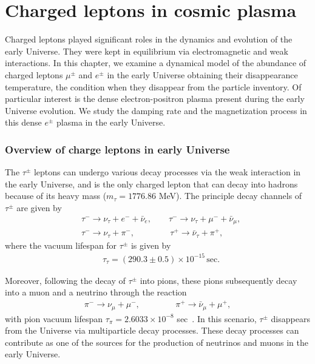 \section{Charged leptons in cosmic plasma}\label{Electron}

Charged leptons played significant roles in the dynamics and evolution of the early Universe. They were kept in equilibrium via electromagnetic and weak interactions.  In this chapter, we examine a dynamical model of the abundance of charged leptons $\mu^\pm$ and $e^\pm$ in the early Universe obtaining their disappearance temperature, the condition when they disappear from the particle inventory. Of particular interest is the dense electron-positron plasma present during the early Universe evolution. We study the damping rate and the magnetization process in this dense $e^\pm$ plasma in the early Universe.

\subsubsection{Overview of charge leptons in early Universe}

The $\tau^\pm$ leptons can undergo various decay processes via the weak interaction in the early Universe, and is the only charged lepton that can decay into hadrons because of its heavy mass ($m_\tau=1776.86$ MeV). The principle decay channels of $\tau^\pm$ are given by
\begin{align}
&\tau^-\rightarrow\nu_\tau+e^-+\bar{\nu}_e,\qquad \tau^-\rightarrow\nu_\tau+\mu^-+\bar{\nu}_\mu,\\
&\tau^-\rightarrow\nu_\tau+\pi^-,\qquad\qquad\,\tau^+\rightarrow\bar{\nu}_\tau+\pi^+,
\end{align}
 where the vacuum lifespan for $\tau^\pm$ is given by ~\cite{ParticleDataGroup:2022pth}
\begin{align}
&\tau_{\tau}=(290.3\pm0.5)\times10^{-15}\,\mathrm{sec}.
\end{align}

Moreover, following the decay of $\tau^\pm$ into pions, these pions subsequently decay into a muon and a neutrino through the reaction
\begin{align}
\pi^-\rightarrow\nu_\mu+\mu^-,\qquad\qquad\,\pi^+\rightarrow\bar{\nu}_\mu+\mu^+,
\end{align}
with pion vacuum lifespan $\tau_\pi=2.6033\times10^{-8}$ sec~\cite{ParticleDataGroup:2022pth}.
In this scenario, $\tau^\pm$ disappears from the Universe via multiparticle decay processes.
These decay processes can contribute as one of the sources for the production of neutrinos and muons in the early Universe.

